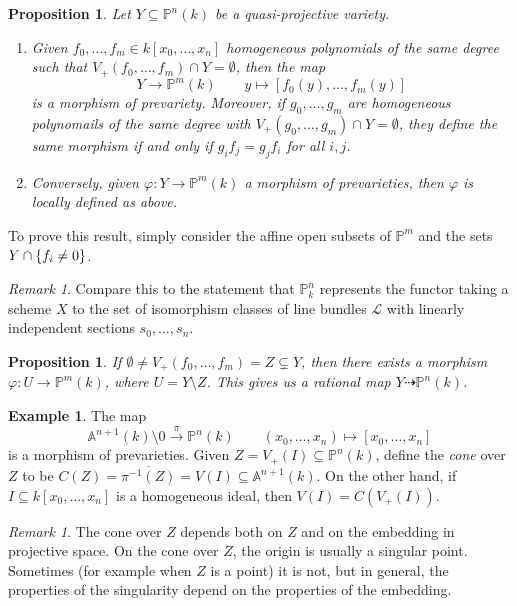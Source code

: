 \documentclass[leqno, openany]{memoir}
\newtheorem{prop}[thm]{Proposition}
\theoremstyle{definition}
\newtheorem{exm}[thm]{Example}
\theoremstyle{remark}
\newtheorem{rmk}[thm]{Remark}
\theoremstyle{plain}
\theoremstyle{definition}
\theoremstyle{remark}
\newcommand{\A}{\mathbb{A}}
\renewcommand{\P}{\mathbb{P}}
\newcommand{\msc}[1]{\mathscr{#1}}
\newcommand{\ol}[1]{\overline{#1}}
\begin{document}
\begin{prop}
    Let $Y \subseteq \P^n(k)$ be a quasi-projective variety. 
    \begin{enumerate}
        \item Given $f_0, \ldots, f_m \in k[x_0, \ldots, x_n]$ homogeneous polynomials of the same degree such that $V_+(f_0, \ldots, f_m) \cap Y = \emptyset$, then the map
            \[ Y \to \P^m(k) \qquad y \mapsto [f_0(y), \ldots, f_m(y)] \]
            is a morphism of prevariety. Moreover, if $g_0, \ldots, g_m$ are homogeneous polynomails of the same degree with $V_+(g_0, \ldots, g_m) \cap Y = \emptyset$, they define the same morphism if and only if $g_i f_j = g_j f_i$ for all $i,j$.
        \item Conversely, given $\varphi \colon Y \to \P^m(k)$ a morphism of prevarieties, then $\varphi$ is locally defined as above.
    \end{enumerate}
\end{prop}

To prove this result, simply consider the affine open subsets of $\P^m$ and the sets $Y \cap \qty{f_i \neq 0}$.

\begin{rmk}
    Compare this to the statement that $\P^n_k$ represents the functor taking a scheme $X$ to the set of isomorphism classes of line bundles $\msc{L}$ with linearly independent sections $s_0, \ldots, s_n$.
\end{rmk}

\begin{prop}
    If $\emptyset \neq V_+(f_0, \ldots, f_m) = Z \subsetneq Y$, then there exists a morphism $\varphi \colon U \to \P^m(k)$, where $U = Y \setminus Z$. This gives us a \textit{rational map} $Y \dashrightarrow \P^n(k)$.
\end{prop}

\begin{exm}
    The map 
    \[ \A^{n+1}(k) \setminus \qty{0} \xrightarrow{\pi} \P^n(k) \qquad (x_0, \ldots, x_n) \mapsto [x_0, \ldots, x_n] \]
    is a morphism of prevarieties. Given $Z = V_+(I) \subseteq \P^n(k)$, define the \textit{cone} over $Z$ to be $C(Z) = \ol{\pi^{-1}(Z)} = V(I) \subseteq \A^{n+1}(k)$. On the other hand, if $I \subseteq k[x_0, \ldots, x_n]$ is a homogeneous ideal, then $V(I) = C(V_+(I))$.
\end{exm}

\begin{rmk}
    The cone over $Z$ depends both on $Z$ and on the embedding in projective space. On the cone over $Z$, the origin is usually a singular point. Sometimes (for example when $Z$ is a point) it is not, but in general, the properties of the singularity depend on the properties of the embedding.
\end{rmk}
\end{document}
